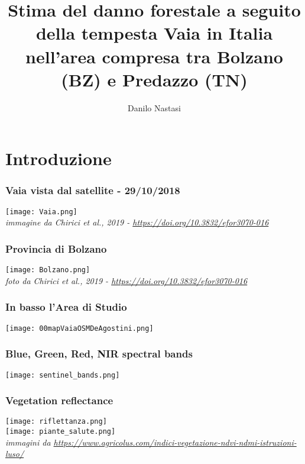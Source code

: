 \documentclass{beamer}
\title{Stima del danno forestale a seguito della tempesta Vaia in Italia nell'area compresa tra Bolzano (BZ) e Predazzo (TN)}
\author{Danilo Nastasi}
\begin{document}
\maketitle



\section{Introduzione}
\begin{frame}
\frametitle{Vaia vista dal satellite - 29/10/2018}
\centering
\texttt{[image: Vaia.png]} \\
\tiny{\textit{immagine da Chirici et al., 2019 - \url{https://doi.org/10.3832/efor3070-016}}}
\end{frame}

\begin{frame}
\frametitle{Provincia di Bolzano}
\centering
\texttt{[image: Bolzano.png]} \\
\tiny{\textit{foto da Chirici et al., 2019 - \url{https://doi.org/10.3832/efor3070-016}}}
\end{frame}

\begin{frame}
\frametitle{In basso l'Area di Studio}
\centering
\texttt{[image: 00mapVaiaOSMDeAgostini.png]}
\end{frame}

\begin{frame}
\frametitle{Blue, Green, Red, NIR spectral bands}
\centering
\texttt{[image: sentinel\_bands.png]}
\end{frame}

\begin{frame}
\frametitle{Vegetation reflectance}
\centering
\texttt{[image: riflettanza.png]} \\
\texttt{[image: piante\_salute.png]} \\
\tiny{\textit{immagini da \url{https://www.agricolus.com/indici-vegetazione-ndvi-ndmi-istruzioni-luso/}}}
\end{frame}
\end{document}
